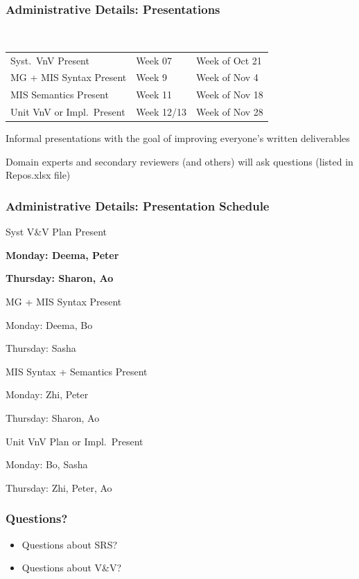 \documentclass[t,12pt,numbers,fleqn]{beamer}
\begin{document}

\begin{frame}
\frametitle{Administrative Details: Presentations}

~\newline
\begin{tabular}{l l l}
Syst.\ VnV Present & Week 07 & Week of Oct 21\\
MG + MIS Syntax Present & Week 9 & Week of Nov 4\\
MIS Semantics Present & Week 11 & Week of Nov 18\\
Unit VnV or Impl.\ Present & Week 12/13 & Week of Nov 28\\
\end {tabular}

\bi
\item Informal presentations with the goal of improving everyone's written
  deliverables
\item Domain experts and secondary reviewers (and others) will ask questions
  (listed in Repos.xlsx file)
\ei

\end{frame}


\begin{frame}
\frametitle{Administrative Details: Presentation Schedule}

\bi
\item Syst V\&V Plan Present
\bi
\item \textbf{Monday: Deema, Peter}
\item \textbf{Thursday: Sharon, Ao}
\ei
\item MG + MIS Syntax Present
\bi
\item Monday:  Deema, Bo
\item Thursday: Sasha
\ei
\item MIS Syntax + Semantics Present
\bi
\item Monday: Zhi, Peter
\item Thursday:  Sharon, Ao
\ei
\item Unit VnV Plan or Impl.\ Present
\bi
\item Monday: Bo, Sasha
\item Thursday: Zhi, Peter, Ao
\ei
\ei

\end{frame}


\begin{frame}
\frametitle{Questions?}
\begin{itemize}
\item Questions about SRS?
\item Questions about V\&V?
\end{itemize}
\end{frame}
\end{document}
